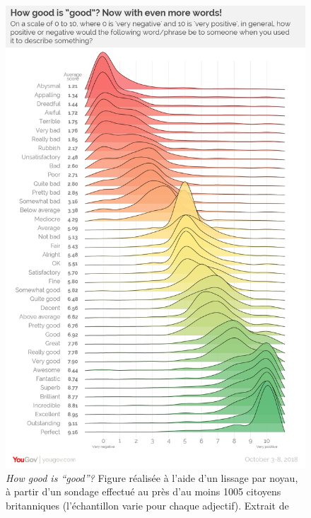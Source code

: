 \begin{figure}
  \centering
  \includegraphics[height=.8\textheight]{../figures/howgood.png}
  \caption{\emph{How good is \foreignquote{english}{good}?} Figure
    réalisée à l'aide d'un lissage par noyau, à partir d'un sondage
    effectué au près d'au moins 1005 citoyens britanniques
    (l'échantillon varie pour chaque adjectif). Extrait de
    \textcite{Smith2018}}
  \label{fig:how_good}
\end{figure}


